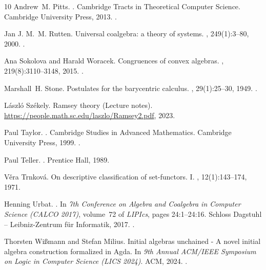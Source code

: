 \documentclass[10pt,a4paper]{article}
\theoremstyle{definition}
\theoremstyle{remark}
\numberwithin{equation}{section}
\theoremstyle{plain}
\theoremstyle{definition}
\begin{document}
\begin{thebibliography}{10}
Andrew~M. Pitts.
.
\newblock Cambridge Tracts in Theoretical Computer Science. Cambridge
  University Press, 2013.
\newblock \href {https://doi.org/10.1017/CBO9781139084673}
  {}.

Jan J. M.~M. Rutten.
\newblock Universal coalgebra: a theory of systems.
, 249(1):3--80, 2000.
\newblock \href {https://doi.org/10.1016/S0304-3975(00)00056-6}
  {}.

Ana Sokolova and Harald Woracek.
\newblock Congruences of convex algebras.
, 219(8):3110--3148, 2015.
\newblock \href {https://doi.org/10.1016/j.jpaa.2014.10.005}
  {}.

Marshall~H. Stone.
\newblock Postulates for the barycentric calculus.
, 29(1):25--30, 1949.
\newblock \href {https://doi.org/10.1007/BF02413910}
  {}.

L\'aszl\'o Sz\'ekely.
\newblock Ramsey theory ({L}ecture notes).
\newblock \url{https://people.math.sc.edu/laszlo/Ramsey2.pdf}, 2023.

Paul Taylor.
.
\newblock Cambridge Studies in Advanced Mathematics. Cambridge University
  Press, 1999.
\newblock \href {https://doi.org/10.2307/3621547} {}.

Paul Teller.
.
\newblock Prentice Hall, 1989.

V\v{e}ra Trnkov\'a.
\newblock On descriptive classification of set-functors. {I}.
, 12(1):143--174, 1971.

Henning Urbat.
.
\newblock In {\em 7th Conference on Algebra and Coalgebra in Computer Science
  (CALCO 2017)}, volume~72 of {\em LIPIcs}, pages 24:1--24:16. Schloss Dagstuhl
  -- Leibniz-Zentrum f{\"u}r Informatik, 2017.
\newblock \href {https://doi.org/10.4230/LIPIcs.CALCO.2017.24}
  {}.

Thorsten Wi\ss{}mann and Stefan Milius.
\newblock Initial algebras unchained - {A} novel initial algebra construction
  formalized in {A}gda.
\newblock In {\em 9th Annual ACM/IEEE Symposium on Logic in Computer Science
  (LICS 2024)}. ACM, 2024.
\newblock \href {https://doi.org/10.1145/3661814.3662105}
  {}.

\end{thebibliography}
\end{document}
